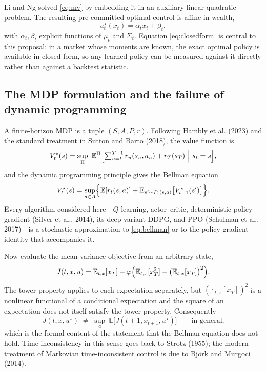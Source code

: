 \documentclass[11pt,a4paper]{article}
\theoremstyle{plain}
\theoremstyle{definition}
\newcommand{\E}{\mathbb{E}}
\begin{document}
Li and Ng solved \eqref{eq:mv} by embedding it in an auxiliary linear-quadratic problem.
The resulting pre-committed optimal control is affine in wealth,
\begin{equation}
u_t^{\star}(x_t)=\alpha_t x_t+\beta_t ,
\label{eq:closedform}
\end{equation}
with $\alpha_t,\beta_t$ explicit functions of $\mu_t$ and $\Sigma_t$. Equation
\eqref{eq:closedform} is central to this proposal: in a market whose moments are known,
the exact optimal policy is available in closed form, so any learned policy can be
measured against it directly rather than against a backtest statistic.

\subsection{The MDP formulation and the failure of dynamic programming}

A finite-horizon MDP is a tuple $(S,A,P,r)$. Following Hambly et al. (2023) and the
standard treatment in Sutton and Barto (2018), the value function is
\begin{equation}
V_t^{\star}(s)=\sup_{\Pi}\ \E^{\Pi}\Bigl[\textstyle\sum_{u=t}^{T-1}r_u(s_u,a_u)+r_T(s_T)\ \Big|\ s_t=s\Bigr],
\label{eq:value}
\end{equation}
and the dynamic programming principle gives the Bellman equation
\begin{equation}
V_t^{\star}(s)=\sup_{a\in A}\Bigl\{\E[r_t(s,a)]+\E_{s'\sim P_t(s,a)}\bigl[V_{t+1}^{\star}(s')\bigr]\Bigr\}.
\label{eq:bellman}
\end{equation}
Every algorithm considered here---$Q$-learning, actor--critic, deterministic policy
gradient (Silver et al., 2014), its deep variant DDPG, and PPO
(Schulman et al., 2017)---is a stochastic approximation to \eqref{eq:bellman} or to
the policy-gradient identity that accompanies it.

Now evaluate the mean-variance objective from an arbitrary state,
\begin{equation}
J(t,x,u)=\E_{t,x}[x_T]-\varphi\Bigl(\E_{t,x}[x_T^2]-\bigl(\E_{t,x}[x_T]\bigr)^2\Bigr).
\end{equation}
The tower property applies to each expectation separately, but $(\E_{t,x}[x_T])^2$ is a
nonlinear functional of a conditional expectation and the square of an expectation does
not itself satisfy the tower property. Consequently
\begin{equation}
J(t,x,u^{\star})\;\neq\;\sup_{a}\ \E\bigl[J(t+1,x_{t+1},u^{\star})\bigr]
\qquad\text{in general,}
\label{eq:fail}
\end{equation}
which is the formal content of the statement that the Bellman equation does not hold.
Time-inconsistency in this sense goes back to Strotz (1955); the modern
treatment of Markovian time-inconsistent control is due to Björk and Murgoci (2014).
\end{document}

